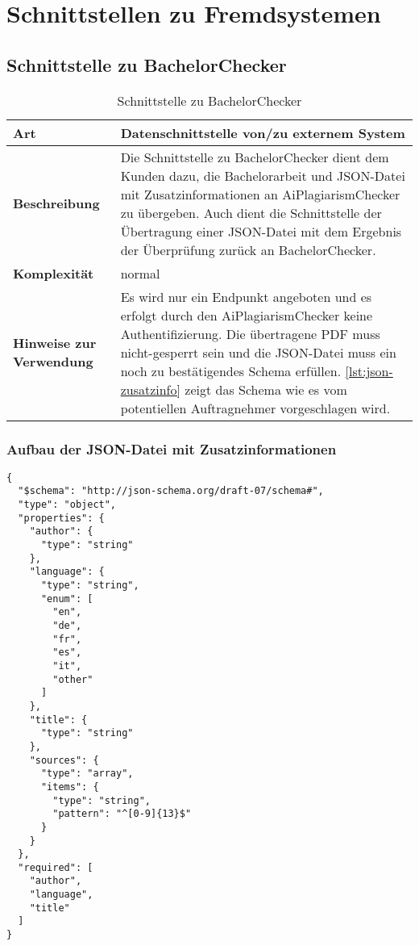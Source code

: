 \chapter{Schnittstellen zu Fremdsystemen}\label{ch:schnittstellen}

\section{Schnittstelle zu BachelorChecker}\label{sec:schnittstelle-bachelorchecker}

\begin{table}[H]\label{tab:schnittstelle-bachelorchecker}
    \begin{tabularx}{\textwidth}{|l|X|}
        \hline
        \textbf{Art} & Datenschnittstelle von/zu externem System \\
        \hline
        \textbf{Beschreibung} & Die Schnittstelle zu BachelorChecker dient dem Kunden dazu, die Bachelorarbeit und JSON-Datei mit Zusatzinformationen an AiPlagiarismChecker zu übergeben.
                                Auch dient die Schnittstelle der Übertragung einer JSON-Datei mit dem Ergebnis der Überprüfung zurück an BachelorChecker. \\
        \hline
        \textbf{Komplexität} & normal \\
        \hline
        \textbf{Hinweise zur Verwendung} & Es wird nur ein Endpunkt angeboten und es erfolgt durch den AiPlagiarismChecker keine Authentifizierung.
                                            Die übertragene PDF muss nicht-gesperrt sein und die JSON-Datei muss ein noch zu bestätigendes Schema erfüllen.
                                            \autoref{lst:json-zusatzinfo} zeigt das Schema wie es vom potentiellen Auftragnehmer vorgeschlagen wird. \\
        \hline
    \end{tabularx}
    \caption {Schnittstelle zu BachelorChecker}
\end{table}

\subsection{Aufbau der JSON-Datei mit Zusatzinformationen}\label{subsec:json-zusatzinfo}
\begin{lstlisting}[caption={JSON-Datei mit Zusatzinformationen},captionpos=b,label={lst:json-zusatzinfo}]
{
  "$schema": "http://json-schema.org/draft-07/schema#",
  "type": "object",
  "properties": {
    "author": {
      "type": "string"
    },
    "language": {
      "type": "string",
      "enum": [
        "en",
        "de",
        "fr",
        "es",
        "it",
        "other"
      ]
    },
    "title": {
      "type": "string"
    },
    "sources": {
      "type": "array",
      "items": {
        "type": "string",
        "pattern": "^[0-9]{13}$"
      }
    }
  },
  "required": [
    "author",
    "language",
    "title"
  ]
}
\end{lstlisting}

